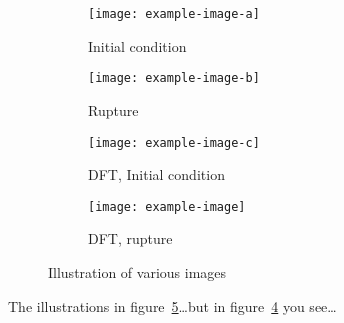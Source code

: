 \documentclass{article}
\begin{document}
\begin{figure}[ht]
	\begin{subfigure}[b]{0.5\linewidth}
		\centering
		\texttt{[image: example-image-a]}
		\caption{Initial condition}
		\label{fig7:a}
		\vspace{4ex}
	\end{subfigure}%
	\begin{subfigure}[b]{0.5\linewidth}
		\centering
		\texttt{[image: example-image-b]}
		\caption{Rupture}
		\label{fig7:b}
		\vspace{4ex}
	\end{subfigure}
	\begin{subfigure}[b]{0.5\linewidth}
		\centering
		\texttt{[image: example-image-c]}
		\caption{DFT, Initial condition}
		\label{fig7:c}
	\end{subfigure}%
	\begin{subfigure}[b]{0.5\linewidth}
		\centering
		\texttt{[image: example-image]}
		\caption{DFT, rupture}
		\label{fig7:d}
	\end{subfigure}
	\caption{Illustration of various images}
	\label{fig7}
\end{figure}

The illustrations in figure~\ref{fig7}\ldots but in figure~\ref{fig7:d} you see\ldots
\end{document}
